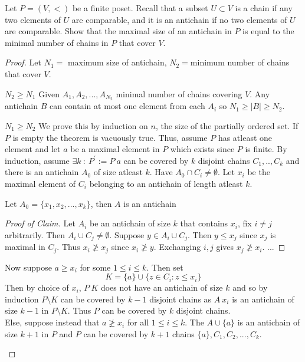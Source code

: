 \documentclass[a4paper]{article}
\begin{document}
	\begin{question}[Question 1]
	Let $P = (V, <)$ be a finite poset. Recall that a subset $U \subset V$ is a chain if any two elements of $U$ are comparable, and it is an antichain if no two elements of $U$ are comparable. Show that the maximal size of an antichain in $P$ is equal to the minimal number of chains in $P$ that cover $V$.
	\end{question}
	\begin{proof}
	Let $N_1 = $ maximum size of antichain, $N_2 = $minimum number of chains that cover $V$.
	\begin{description}
	\item \underline{$N_2 \geq N_1$} Given $A_1, A_2, ..., A_{N_2}$ minimal number of chains covering $V$. Any antichain $B$ can contain at most one element from each $A_i$ so $N_1 \geq |B| \geq N_2$.
	\item \underline{$N_1 \geq N_2$} We prove this by induction on $n$, the size of the partially ordered set. If $P$ is empty the theorem is vacuously true. Thus, assume $P$ has atleast one element and let $a$ be a maximal element in $P$ which exists since $P$ is finite. By induction, assume $\exists k \ : \ P^{'} := P \ {a}$ can be covered by $k$ disjoint chains $C_1,..,C_k$ and there is an antichain $A_0$ of size atleast $k$. Have $A_0 \cap C_i \not = \emptyset$. Let $x_i$ be the maximal element of $C_i$ belonging to an antichain of length atleast $k$.\\
	\begin{remark}[Claim] Let $A_0 = \{x_1,x_2,...,x_k\}$, then $A$ is an antichain
	\begin{proof}[Proof of Claim]\renewcommand{\qedsymbol}{}
	Let $A_i$ be an antichain of size $k$ that contains $x_i$, fix $i \not = j$
  arbitrarily. Then $A_i \cup C_j \not = \emptyset$. Suppose $y \in A_i \cup
  C_j$. Then $y \leq x_j$ since $x_j$ is maximal in $C_j$. Thus $x_i \not \geq
  x_j$ since $x_i \not \geq y$. Exchanging $i,j$ gives $x_j \not \geq x_i$. ...
	\end{proof}
	\end{remark}
	Now suppose $a \geq x_i$ for some $1 \leq i \leq k$. Then set
	\[K = \{a\} \cup \{z \in C_i : z \leq x_i\}\]
	Then by choice of $x_i$, $P \ K$ does not have an antichain of size $k$ and so by induction $P \setminus K$ can be covered by $k-1$ disjoint chains as $A \ {x_i}$ is an antichain of size $k-1$ in $P \setminus K$. Thus $P$ can be covered by $k$ disjoint chains.\\
	Else, suppose instead that $a \not \geq x_i$ for all $1 \leq i \leq k$. The $A \cup \{a\}$ is an antichain of size $k+1$ in $P$ and $P$ can be covered by $k+1$ chains $\{a\}, C_1, C_2,...,C_k$.
	\end{description}
	\end{proof}
\end{document}
